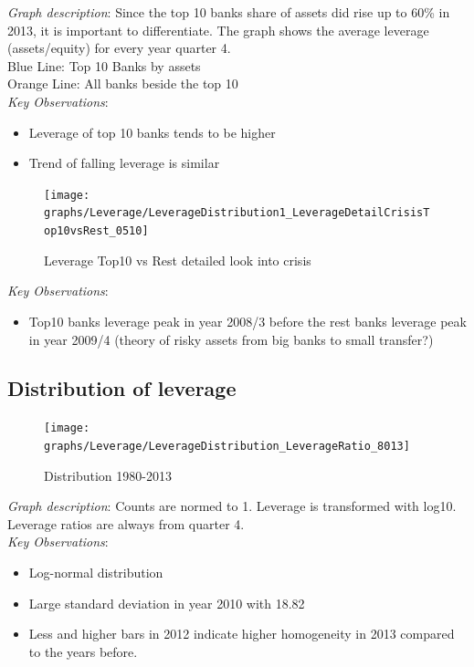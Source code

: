 \documentclass[12pt, a4paper]{article} %
\begin{document}
\newpage

\noindent \textit{Graph description}: Since the top 10 banks share of assets did rise up to 60\% in 2013, it is important to differentiate. The graph shows the average leverage (assets/equity) for every year quarter 4.\\ Blue Line: Top 10 Banks by assets\\
Orange Line: All banks beside the top 10\\

\noindent \textit{Key Observations}:
\begin{itemize}
\item Leverage of top 10 banks tends to be higher
\item Trend of falling leverage is similar
\end{itemize}




\begin{figure}[hbtp]
\centering
\caption{Leverage Top10 vs Rest detailed look into crisis}
\texttt{[image: graphs/Leverage/LeverageDistribution1\_LeverageDetailCrisisTop10vsRest\_0510]}
\end{figure}


\noindent \textit{Key Observations}:
\begin{itemize}
\item Top10 banks leverage peak in year 2008/3 before the rest banks leverage peak in year 2009/4 (theory of risky assets from big banks to small transfer?) 
\end{itemize}





\subsection{Distribution of leverage}



\begin{figure}[hbtp]
\centering
\caption{Distribution 1980-2013}
\texttt{[image: graphs/Leverage/LeverageDistribution\_LeverageRatio\_8013]}
\end{figure}

\noindent \textit{Graph description}: Counts are normed to 1. Leverage is transformed with log10. Leverage ratios are always from quarter 4.
\\

\noindent \textit{Key Observations}:
\begin{itemize}
\item Log-normal distribution
\item Large standard deviation in year 2010 with 18.82
\item Less and higher bars in 2012 indicate higher homogeneity in 2013 compared to the years before.
\end{itemize}
\end{document}

